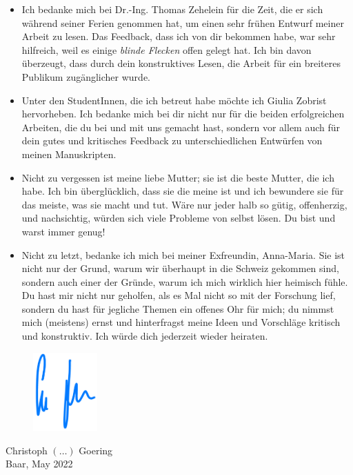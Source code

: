 \begin{itemize}[label=$\succ$]
  \item Ich bedanke mich bei Dr.-Ing. Thomas Zehelein für die Zeit, die er sich 
    während seiner Ferien genommen hat, um einen sehr frühen Entwurf meiner 
    Arbeit zu lesen. Das Feedback, dass ich von dir bekommen habe, war sehr 
    hilfreich, weil es einige \emph{blinde Flecken} offen gelegt hat. Ich bin 
    davon überzeugt, dass durch dein konstruktives Lesen, die Arbeit für ein 
    breiteres Publikum zugänglicher wurde.

  \item Unter den StudentInnen, die ich betreut habe möchte ich Giulia Zobrist 
    hervorheben. Ich bedanke mich bei dir nicht nur für die beiden 
    erfolgreichen Arbeiten, die du bei und mit uns gemacht hast, sondern vor 
    allem auch für dein gutes und kritisches Feedback zu unterschiedlichen 
    Entwürfen von meinen Manuskripten.

  \item Nicht zu vergessen ist meine liebe Mutter; sie ist die beste Mutter, 
    die ich habe. Ich bin überglücklich, dass sie die meine ist und ich 
    bewundere sie für das meiste, was sie macht und tut. Wäre nur jeder halb so 
    gütig, offenherzig, und nachsichtig, würden sich viele Probleme von selbst 
    lösen. Du bist und warst immer genug!

  \item Nicht zu letzt, bedanke ich mich bei meiner Exfreundin, Anna-Maria. Sie 
  ist nicht nur der Grund, warum wir überhaupt in die Schweiz gekommen sind, 
  sondern auch einer der Gründe, warum ich mich wirklich hier heimisch fühle. 
  Du hast mir nicht nur geholfen, als es Mal nicht so mit der Forschung lief, 
  sondern du hast für jegliche Themen ein offenes Ohr für mich; du nimmst mich 
  (meistens) ernst und hinterfragst meine Ideen und Vorschläge kritisch und 
  konstruktiv. Ich würde dich jederzeit wieder heiraten.

\end{itemize}


\begin{flushleft}
\begin{figure}[h]
\begin{flushleft}
 \hspace{1 cm}
 \includegraphics[height=3cm]{Unterschrift.png}
\end{flushleft}
\end{figure}
\vspace{-0.1 cm}
\hspace{1 cm} Christoph $(\ldots)$ Goering\\
\hspace{1 cm} Baar, May 2022
\end{flushleft}
